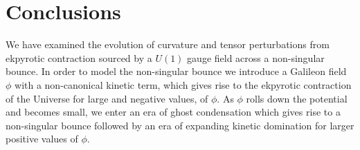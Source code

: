 \documentclass[12pt,a4paper]{article}
\numberwithin{equation}{section}
\numberwithin{equation}{section}
\begin{document}
\section{Conclusions}
We have examined the evolution of curvature and tensor perturbations from ekpyrotic contraction sourced by a $U(1)$ gauge field across a non-singular bounce. In order to model the non-singular bounce we introduce a Galileon field $\phi$ with a non-canonical kinetic term, which gives rise to the ekpyrotic contraction of the Universe for large and negative values, of $\phi$. As $\phi$ rolls down the potential and becomes small, we enter an era of ghost condensation which gives rise to a non-singular bounce followed by an era of expanding kinetic domination for larger positive values of $\phi$. 
\end{document}
